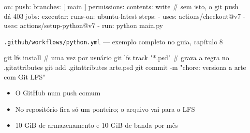 \begin{frame}[fragile]{}
\begin{yml}
on:
  push:
    branches: [ main ]
permissions:
  contents: write            # sem isto, o git push dá 403
jobs:
  executar:
    runs-on: ubuntu-latest
    steps:
      - uses: actions/checkout@v7
      - uses: actions/setup-python@v7
      - run: python main.py
\end{yml}
  {\footnotesize \textcolor{codecomment}{\texttt{.github/workflows/python.yml} — exemplo completo no guia, capítulo 8}}

\end{frame}


\begin{frame}[fragile]{}
\begin{sh}
git lfs install                  # uma vez por usuário
git lfs track "*.psd"            # grava a regra no .gitattributes
git add .gitattributes arte.psd
git commit -m "chore: versiona a arte com Git LFS"
\end{sh}
  \begin{itemize}
    \item O GitHub  num push comum
    \item No repositório fica só um ponteiro; o arquivo vai para o LFS
    \item 10 GiB de armazenamento e 10 GiB de banda por mês
  \end{itemize}

\end{frame}

